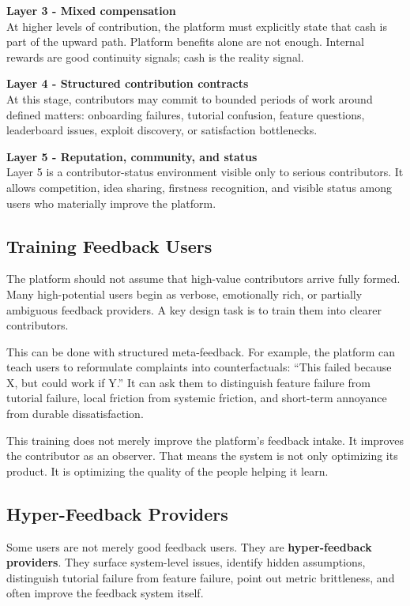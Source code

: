 \documentclass[11pt]{article}
\begin{document}
\textbf{Layer 3 - Mixed compensation}\\
At higher levels of contribution, the platform must explicitly state that cash is part of the upward path. Platform benefits alone are not enough. Internal rewards are good continuity signals; cash is the reality signal.

\textbf{Layer 4 - Structured contribution contracts}\\
At this stage, contributors may commit to bounded periods of work around defined matters: onboarding failures, tutorial confusion, feature questions, leaderboard issues, exploit discovery, or satisfaction bottlenecks.

\textbf{Layer 5 - Reputation, community, and status}\\
Layer 5 is a contributor-status environment visible only to serious contributors. It allows competition, idea sharing, firstness recognition, and visible status among users who materially improve the platform.

\subsection{Training Feedback Users}

The platform should not assume that high-value contributors arrive fully formed. Many high-potential users begin as verbose, emotionally rich, or partially ambiguous feedback providers. A key design task is to train them into clearer contributors.

This can be done with structured meta-feedback. For example, the platform can teach users to reformulate complaints into counterfactuals: ``This failed because X, but could work if Y.'' It can ask them to distinguish feature failure from tutorial failure, local friction from systemic friction, and short-term annoyance from durable dissatisfaction.

This training does not merely improve the platform's feedback intake. It improves the contributor as an observer. That means the system is not only optimizing its product. It is optimizing the quality of the people helping it learn.

\subsection{Hyper-Feedback Providers}

Some users are not merely good feedback users. They are \textbf{hyper-feedback providers}. They surface system-level issues, identify hidden assumptions, distinguish tutorial failure from feature failure, point out metric brittleness, and often improve the feedback system itself.
\end{document}
